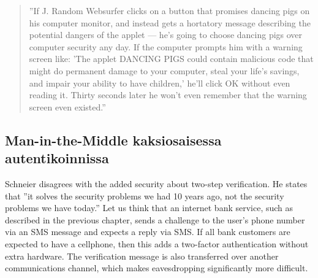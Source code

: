 \documentclass[english,gradu]{tktltiki}
\begin{document}
            \begin{quote}
              \label{quote:dancing_pigs}
              ''If J. Random Websurfer clicks on a button that promises dancing pigs on his computer monitor, and instead gets a hortatory message describing the potential dangers of the applet — he's going to choose dancing pigs over computer security any day. If the computer prompts him with a warning screen like: 'The applet DANCING PIGS could contain malicious code that might do permanent damage to your computer, steal your life's savings, and impair your ability to have children,' he'll click OK without even reading it. Thirty seconds later he won't even remember that the warning screen even existed.'' \cite{schneier_secrets_and_lies_2000}
            \end{quote}




\subsection{Man-in-the-Middle kaksiosaisessa autentikoinnissa} %
\label{sub:man_in_the_middle_kaksiosaisessa_autentikoinnissa}


            Schneier \cite{schneier_2factor_2005} disagrees with the added security about two-step verification. He states that ''it solves the security problems we had 10 years ago, not the security problems we have today.'' Let us think that an internet bank service, such as described in the previous chapter, sends a challenge to the user's phone number via an SMS message and expects a reply via SMS. If all bank customers are expected to have a cellphone, then this adds a two-factor authentication without extra hardware. The verification message is also transferred over another communications channel, which makes eavesdropping significantly more difficult.
\end{document}
